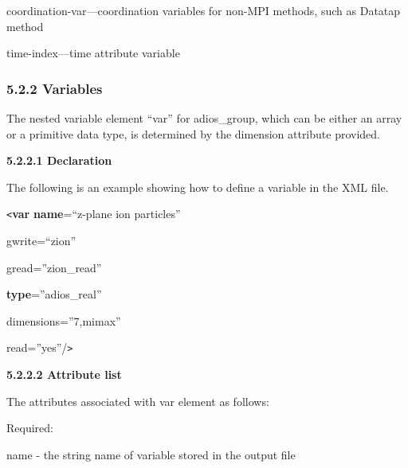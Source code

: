 \vspace{10pt}
coordination-var---coordination variables for non-MPI methods, such as Datatap 
method

\vspace{10pt}
time-index---time attribute variable\label{HToc82067520}\label{HToc84890244}\label{HToc212016620}\label{HToc212016862}\label{HRef278369587}\label{HToc182553367}

\vspace{10pt}
\subsubsection*{{\large \textbf{5.2.2 Variables}}}

\vspace{10pt}
\leftskip=0pt
\parindent=0pt
The nested variable element ``var'' for adios\_group, which can be either an array 
or a primitive data type, is determined by the dimension attribute provided. 

\vspace{10pt}
\textbf{5.2.2.1 Declaration}

\vspace{10pt}
The following is an example showing how to define a variable in the XML file. 

\vspace{10pt}
\texttt{<}\textbf{var} \textbf{name}=``z-plane ion particles'' 

\vspace{10pt}
\leftskip=27pt
gwrite=``zion''

\vspace{10pt}
gread=''zion\_read''

\vspace{10pt}
\textbf{type}=''adios\_real''

\vspace{10pt}
dimensions=''7,mimax''

\vspace{10pt}
read=''yes''/\texttt{>}

\vspace{22pt}
\leftskip=0pt
\textbf{5.2.2.2 Attribute list}

\vspace{10pt}
The attributes associated with var element  as follows: 

\vspace{10pt}
Required:

\vspace{10pt}
\leftskip=18pt
\parindent=3pt
name - the string name of variable stored in the output file

